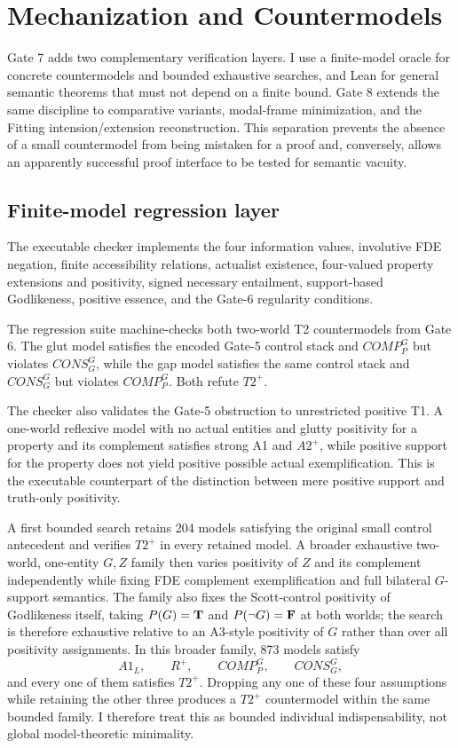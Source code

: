 \section{Mechanization and Countermodels}
\label{sec:mechanization}

\statusestablished

Gate 7 adds two complementary verification layers. I use a finite-model oracle for concrete countermodels and bounded exhaustive searches, and Lean for general semantic theorems that must not depend on a finite bound. Gate 8 extends the same discipline to comparative variants, modal-frame minimization, and the Fitting intension/extension reconstruction. This separation prevents the absence of a small countermodel from being mistaken for a proof and, conversely, allows an apparently successful proof interface to be tested for semantic vacuity.

\subsection{Finite-model regression layer}
\label{sec:finite-layer}

The executable checker implements the four information values, involutive FDE negation, finite accessibility relations, actualist existence, four-valued property extensions and positivity, signed necessary entailment, support-based Godlikeness, positive essence, and the Gate-6 regularity conditions.

The regression suite machine-checks both two-world T2 countermodels from Gate 6. The glut model satisfies the encoded Gate-5 control stack and \(COMP_P^G\) but violates \(CONS_G^G\), while the gap model satisfies the same control stack and \(CONS_G^G\) but violates \(COMP_P^G\). Both refute \(T2^+\).

The checker also validates the Gate-5 obstruction to unrestricted positive T1. A one-world reflexive model with no actual entities and glutty positivity for a property and its complement satisfies strong A1 and \(A2^+\), while positive support for the property does not yield positive possible actual exemplification. This is the executable counterpart of the distinction between mere positive support and truth-only positivity.

A first bounded search retains 204 models satisfying the original small control antecedent and verifies \(T2^+\) in every retained model. A broader exhaustive two-world, one-entity \(G,Z\) family then varies positivity of \(Z\) and its complement independently while fixing FDE complement exemplification and full bilateral \(G\)-support semantics. The family also fixes the Scott-control positivity of Godlikeness itself, taking \(P(G)=\mathbf{T}\) and \(P(\neg G)=\mathbf{F}\) at both worlds; the search is therefore exhaustive relative to an A3-style positivity of \(G\) rather than over all positivity assignments. In this broader family, 873 models satisfy
\[
 A1_L,\qquad R^+,\qquad COMP_P^G,\qquad CONS_G^G,
\]
and every one of them satisfies \(T2^+\). Dropping any one of these four assumptions while retaining the other three produces a \(T2^+\) countermodel within the same bounded family. I therefore treat this as bounded individual indispensability, not global model-theoretic minimality.

